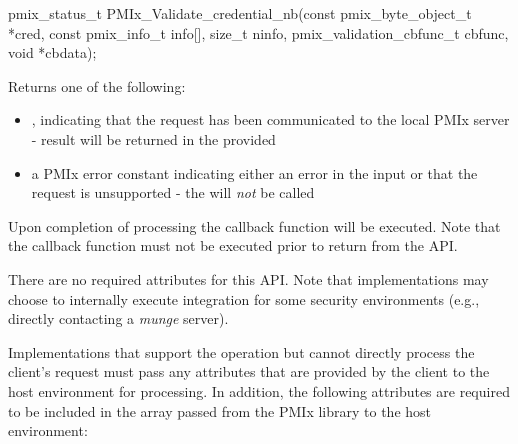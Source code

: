 \format

\cspecificstart
\begin{codepar}
pmix_status_t
PMIx_Validate_credential_nb(const pmix_byte_object_t *cred,
                            const pmix_info_t info[], size_t ninfo,
                            pmix_validation_cbfunc_t cbfunc,
                            void *cbdata);
\end{codepar}
\cspecificend

\begin{arglist}
\end{arglist}

Returns one of the following:

\begin{itemize}
    \item {}, indicating that the request has been communicated to the local \ac{PMIx} server - result will be returned in the provided 
    \item a \ac{PMIx} error constant indicating either an error in the input or that the request is unsupported - the  will \textit{not} be called
\end{itemize}

Upon completion of processing the callback function will be executed. Note that the callback function must not be executed prior to return from the \ac{API}.

\reqattrstart
There are no required attributes for this \ac{API}. Note that implementations may choose to internally
execute integration for some security environments (e.g., directly
contacting a \textit{munge} server).

Implementations that support the operation but cannot directly process the client's request must pass any attributes that are provided by the client to the host environment for processing. In addition, the following attributes are required to be included in the  array passed from the \ac{PMIx} library to the host environment:


